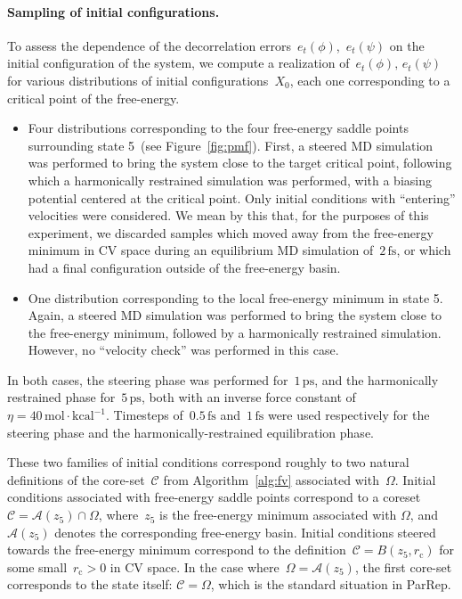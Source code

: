\documentclass[a4]{article}
\newcommand{\1}{\mathbbm 1}
\newcommand{\basin}[1]{\mathcal A(#1)}
\begin{document}
\paragraph{Sampling of initial configurations.}
To assess the dependence of the decorrelation errors~$e_t(\phi)$,~$e_t(\psi)$ on the initial configuration of the system, we compute a realization of~$e_t(\phi),\,e_t(\psi)$ for various distributions of initial configurations~$X_0$, each one corresponding to a critical point of the free-energy.
\begin{itemize}
    \item{Four distributions corresponding to the four free-energy saddle points surrounding state 5~(see Figure~\ref{fig:pmf}). First, a steered MD simulation was performed to bring the system close to the target critical point, following which a harmonically restrained simulation was performed, with a biasing potential centered at the critical point. Only initial conditions with ``entering'' velocities were considered. We mean by this that, for the purposes of this experiment, we discarded samples which moved away from the free-energy minimum in CV space during an equilibrium MD simulation of~$2\,\mathrm{fs}$, or which had a final configuration outside of the free-energy basin.}
    \item{One distribution corresponding to the local free-energy minimum in state 5. Again, a steered MD simulation was performed to bring the system close to the free-energy minimum, followed by a harmonically restrained simulation. However, no ``velocity check'' was performed in this case.}
\end{itemize}
In both cases, the steering phase was performed for~$1\,\mathrm{ps}$, and the harmonically restrained phase for~$5\,\mathrm{ps}$, both with an inverse force constant of~$\eta=40\,\mathrm{mol}\cdot\mathrm{kcal}^{-1}$.
Timesteps of~$0.5\,\mathrm{fs}$ and~$1\,\mathrm{fs}$ were used respectively for the steering phase and the harmonically-restrained equilibration phase.

These two families of initial conditions correspond roughly to two natural definitions of the core-set~$\mathcal C$ from Algorithm~\ref{alg:fv} associated with~$\Omega$. Initial conditions associated with free-energy saddle points correspond to a coreset~$\mathcal C=\basin{z_5}\cap\Omega$, where~$z_5$ is the free-energy minimum associated with $\Omega$, and~$\basin{z_5}$  denotes the corresponding free-energy basin. Initial conditions steered towards the free-energy minimum correspond to the definition~$\mathcal C = B(z_5,r_{\mathrm{c}})$ for some small~$r_{\mathrm{c}}>0$ in CV space.
In the case where~$\Omega =\basin{z_5}$, the first core-set corresponds to the state itself: $\mathcal C=\Omega$, which is the standard situation in ParRep.
\end{document}
